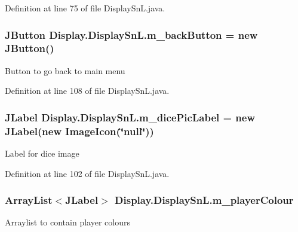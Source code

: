 Definition at line 75 of file Display\+Sn\+L.\+java.

\hypertarget{class_display_1_1_display_sn_l_a9452f0a663eaea507cf3561851e5c74e}{}
\subsubsection[{m\+\_\+back\+Button}]{\setlength{\rightskip}{0pt plus 5cm}J\+Button Display.\+Display\+Sn\+L.\+m\+\_\+back\+Button = new J\+Button()\hspace{0.3cm}{\ttfamily [private]}}\label{class_display_1_1_display_sn_l_a9452f0a663eaea507cf3561851e5c74e}
Button to go back to main menu 

Definition at line 108 of file Display\+Sn\+L.\+java.

\hypertarget{class_display_1_1_display_sn_l_aafb6d505956de58bbd229a789342ef19}{}
\subsubsection[{m\+\_\+dice\+Pic\+Label}]{\setlength{\rightskip}{0pt plus 5cm}J\+Label Display.\+Display\+Sn\+L.\+m\+\_\+dice\+Pic\+Label = new J\+Label(new Image\+Icon(\char`\"{}null\char`\"{}))\hspace{0.3cm}{\ttfamily [private]}}\label{class_display_1_1_display_sn_l_aafb6d505956de58bbd229a789342ef19}
Label for dice image 

Definition at line 102 of file Display\+Sn\+L.\+java.

\hypertarget{class_display_1_1_display_sn_l_a075a16b363ea3d1e75e589fe11b2b0e7}{}
\subsubsection[{m\+\_\+player\+Colour}]{\setlength{\rightskip}{0pt plus 5cm}Array\+List$<$J\+Label$>$ Display.\+Display\+Sn\+L.\+m\+\_\+player\+Colour\hspace{0.3cm}{\ttfamily [private]}}\label{class_display_1_1_display_sn_l_a075a16b363ea3d1e75e589fe11b2b0e7}
Arraylist to contain player colours 

